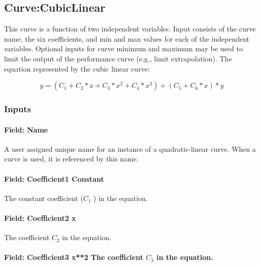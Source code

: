 \subsection{Curve:CubicLinear}\label{curvecubiclinear}

This curve is a function of two independent variables. Input consists of the curve name, the six coefficients, and min and max values for each of the independent variables. Optional inputs for curve minimum and maximum may be used to limit the output of the performance curve (e.g., limit extrapolation). The equation represented by the cubic linear curve:

\begin{equation}
y = \left( {{C_1} + {C_2}*x + {C_3}*{x^2} + {C_4}*{x^3}} \right) + \left( {{C_5} + {C_6}*x} \right)*y
\end{equation}

\subsubsection{Inputs}\label{inputs-8-014}

\paragraph{Field: Name}\label{field-name-8-012}

A user assigned unique name for an instance of a quadratic-linear curve. When a curve is used, it is referenced by this name.

\paragraph{Field: Coefficient1 Constant}\label{field-coefficient1-constant-8}

The constant coefficient (\(C_1\) ) in the equation.

\paragraph{Field: Coefficient2 x}\label{field-coefficient2-x-6}

The coefficient \(C_2\) in the equation.

\paragraph{Field: Coefficient3 x**2 The coefficient \(C_3\) in the equation.}\label{field-coefficient3-x2-the-coefficient-cux5f3-in-the-equation.}

